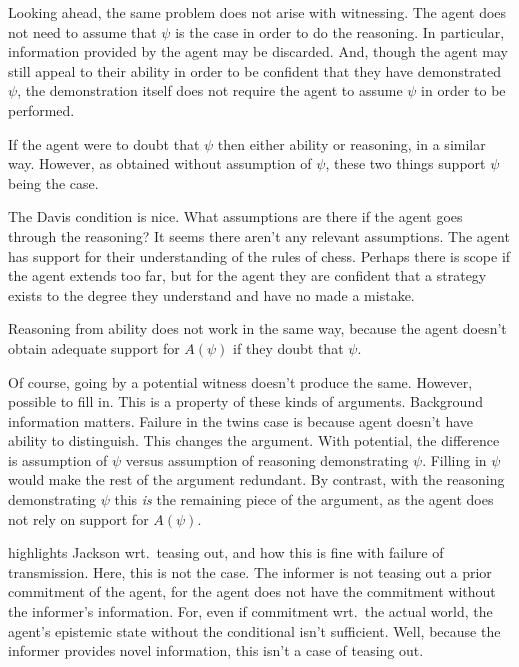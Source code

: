 \documentclass[10pt]{article}
\begin{document}
\begin{note}
  Looking ahead, the same problem does not arise with witnessing.
  The agent does not need to assume that \(\psi\) is the case in order to do the reasoning.
  In particular, information provided by the agent may be discarded.
  And, though the agent may still appeal to their ability in order to be confident that they have demonstrated \(\psi\), the demonstration itself does not require the agent to assume \(\psi\) in order to be performed.

  If the agent were to doubt that \(\psi\) then either ability or reasoning, in a similar way.
  However, as obtained without assumption of \(\psi\), these two things support \(\psi\) being the case.

  The Davis condition is nice.
  What assumptions are there if the agent goes through the reasoning?
  It seems there aren't any relevant assumptions.
  The agent has support for their understanding of the rules of chess.
  Perhaps there is scope if the agent extends too far, but for the agent they are confident that a strategy exists to the degree they understand and have no made a mistake.

  Reasoning from ability does not work in the same way, because the agent doesn't obtain adequate support for \(A(\psi)\) if they doubt that \(\psi\).

  Of course, going by a potential witness doesn't produce the same.
  However, possible to fill in.
  This is a property of these kinds of arguments.
  Background information matters.
  Failure in the twins case is because agent doesn't have ability to distinguish.
  This changes the argument.
  With potential, the difference is assumption of \(\psi\) versus assumption of reasoning demonstrating \(\psi\).
  Filling in \(\psi\) would make the rest of the argument redundant.
  By contrast, with the reasoning demonstrating \(\psi\) this \emph{is} the remaining piece of the argument, as the agent does not rely on support for \(A(\psi)\).
\end{note}

\begin{note}
  \cite{Otero:2018we} highlights Jackson wrt.\ teasing out, and how this is fine with failure of transmission.
  Here, this is not the case.
  The informer is not teasing out a prior commitment of the agent, for the agent does not have the commitment without the informer's information.
  For, even if commitment wrt.\ the actual world, the agent's epistemic state without the conditional isn't sufficient.
  Well, because the informer provides novel information, this isn't a case of teasing out.
\end{note}
\end{document}
